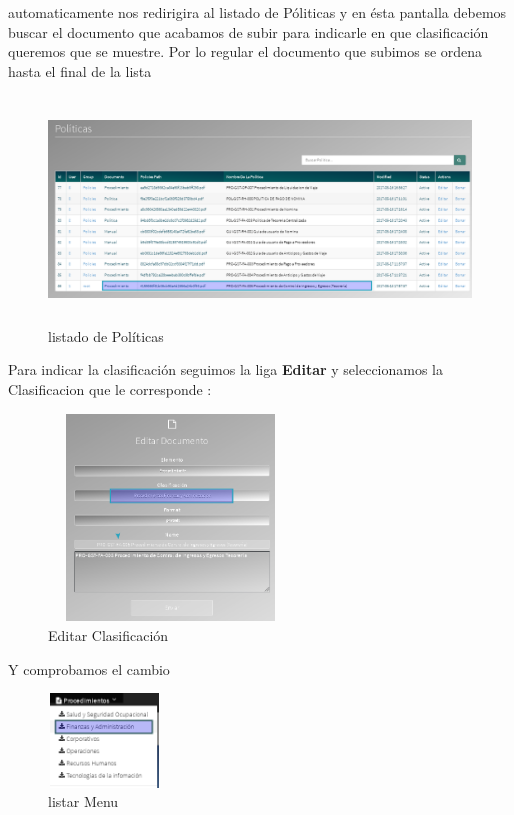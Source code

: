 \documentclass[12pt,letterpaper]{article}
\begin{document}
\begin{subsection}{\color{blackgreen}}
{       automaticamente nos redirigira al listado de P\'oliticas y en \'esta pantalla debemos buscar el documento que acabamos de subir para indicarle
       en que clasificaci\'on queremos que se muestre.
       Por lo regular el documento que subimos se ordena hasta el final de la lista

         \begin{figure}[htb]
           \centering
           \includegraphics[angle=0,width=160mm,height=60mm]{img/Selection_059.png}
           \caption{listado de Pol\'iticas}
           \label{sel56}
         \end{figure}

\newpage
        Para indicar la clasificaci\'on seguimos la liga \textbf{Editar} y seleccionamos la Clasificacion que le corresponde :
        \begin{figure}[htb]
          \centering
          \includegraphics[angle=0,width=65mm,height=55mm]{img/Selection_060.png}
          \caption{Editar Clasificaci\'on}
          \label{sel60}
        \end{figure}

        Y comprobamos el cambio

        \begin{figure}[htb]
          \centering
          \includegraphics[angle=0,width=30mm,height=25mm]{img/Menu_065.png}
          \caption{listar Menu}
          \label{sel56}
        \end{figure}

}
\end{subsection}
\end{document}
